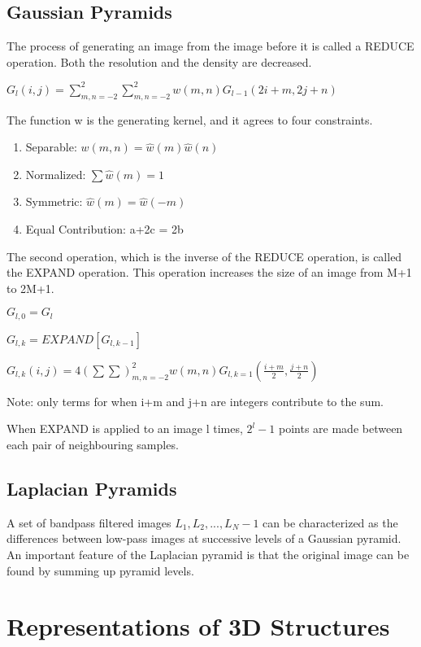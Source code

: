 \documentclass{article}
\begin{document}
\begin{multicols}{2}
\subsection{Gaussian Pyramids}

The process of generating an image from the image before it is called a REDUCE operation. Both the resolution and the density are decreased.

$G_l(i,j) = \sum _{m,n = -2}^2 \sum _{m,n = -2}^2 w(m,n) G_{l-1} (2i+m, 2j+n)$

The function w is the generating kernel, and it agrees to four constraints.

\begin{enumerate}
  \item {Separable: $w(m,n) = \hat{w}(m)\hat{w}(n)$}
  \item {Normalized: $\sum \hat{w}(m) = 1$}
  \item {Symmetric: $\hat{w}(m) = \hat{w}(-m)$}
  \item {Equal Contribution: a+2c = 2b}
\end{enumerate}

The second operation, which is the inverse of the REDUCE operation, is called the EXPAND operation. This operation increases the size of an image from M+1 to 2M+1.

$G_{l,0} = G_l$

$G_{l,k} = EXPAND[G_{l,k-1}]$

$G_{l,k}(i,j) = 4(\sum \sum)_{m,n = -2}^2 w(m,n) G_{l,k=1}(\frac{i+m}{2}, \frac{j+n}{2})$ 

Note: only terms for when i+m and j+n are integers contribute to the sum.

When EXPAND is applied to an image l times, $2^l-1$ points are made between each pair of neighbouring samples.

\subsection{Laplacian Pyramids}

A set of bandpass filtered images $L_1, L_2, ..., L_N-1$ can be characterized as the differences between low-pass images at successive levels of a Gaussian pyramid. An important feature of the Laplacian pyramid is that the original image can be found by summing up pyramid levels.

\section{Representations of 3D Structures}

\end{multicols}
\end{document}

